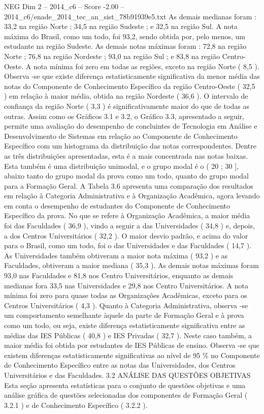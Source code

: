 \begin{textsample}{NEG Dim 2 – 2014\_c6 – Score -2.00 – 2014\_c6/enade\_2014\_tec\_an\_sist\_78b91939e5.txt}
As demais medianas foram : 33,2 na região Norte ; 34,5 na região Sudeste ; e 32,5 na região Sul.
A nota máxima do Brasil, como um todo, foi 93,2, sendo obtida por, pelo menos, um estudante na região Sudeste.
As demais notas máximas foram : 72,8 na região Norte ; 76,8 na região Nordeste ; 93,0 na região Sul ; e 83,8 na região Centro-Oeste.
A nota mínima foi zero em todas as regiões, exceto na região Norte ( 8,5 ).
Observa -se que existe diferença estatisticamente significativa da menor média das notas do Componente de Conhecimento Específico da região Centro-Oeste ( 32,5 ) em relação à maior média, obtida na região Nordeste ( 36,6 ).
O intervalo de confiança da região Norte ( 3,3 ) é significativamente maior do que de todas as outras.
Assim como os Gráficos 3.1 e 3.2, o Gráfico 3.3, apresentado a seguir, permite uma avaliação do desempenho de concluintes de Tecnologia em Análise e Desenvolvimento de Sistemas em relação ao Componente de Conhecimento Específico com um histograma da distribuição das notas correspondentes.
Dentre as três distribuições apresentadas, esta é a mais concentrada nas notas baixas.
Esta também é uma distribuição unimodal, e o grupo modal é o ( 20 ; 30 ], abaixo tanto do grupo modal da prova como um todo, quanto do grupo modal para a Formação Geral.
A Tabela 3.6 apresenta uma comparação dos resultados em relação à Categoria Administrativa e à Organização Acadêmica, agora levando em conta o desempenho de estudantes do Componente de Conhecimento Específico da prova.
No que se refere à Organização Acadêmica, a maior média foi das Faculdades ( 36,9 ), vindo a seguir a das Universidades ( 34,8 ) e, depois, a dos Centros Universitários ( 32,2 ).
O maior desvio padrão, e acima do valor para o Brasil, como um todo, foi o das Universidades e das Faculdades ( 14,7 ).
As Universidades também obtiveram a maior nota máxima ( 93,2 ) e as Faculdades, obtiveram a maior mediana ( 35,3 ).
As demais notas máximas foram 93,0 nas Faculdades e 81,8 nos Centro Universitários, enquanto as demais medianas fora 33,5 nas Universidades e 29,8 nos Centro Universitários.
A nota mínima foi zero para quase todas as Organizações Acadêmicas, exceto para os Centros Universitários ( 4,3 ).
Quanto à Categoria Administrativa, observa -se um comportamento semelhante àquele da parte de Formação Geral e à prova como um todo, ou seja, existe diferença estatisticamente significativa entre as médias das IES Públicas ( 40,8 ) e IES Privadas ( 32,7 ).
Neste caso também, a maior média foi obtida por estudantes de IES Públicas de ensino.
Observa -se que existem diferenças estatisticamente significativas ao nível de 95 \% no Componente de Conhecimento Específico entre as notas das Universidades, dos Centros Universitários e das Faculdades. 3.2 ANÁLISE DAS QUESTÕES OBJETIVAS Esta seção apresenta estatísticas para o conjunto de questões objetivas e uma análise gráfica de questões selecionadas dos componentes de Formação Geral ( 3.2.1 ) e de Conhecimento Específico ( 3.2.2 ).

\end{textsample}
